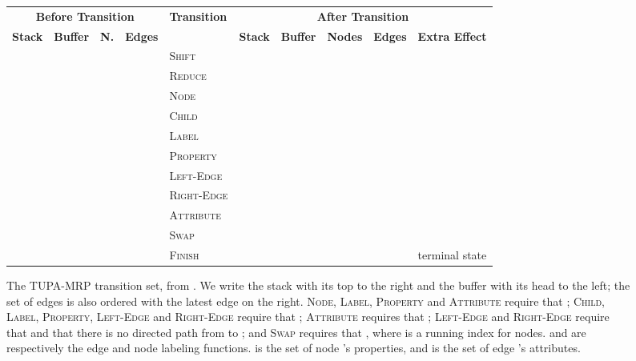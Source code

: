 \documentclass[11pt,a4paper]{article}
\begin{document}
\begin{figure*}[ht]
	\begin{adjustbox}{width=.99\textwidth,margin=1pt,frame}
	\begin{tabular}{llll|l|lllll}
		\multicolumn{4}{c|}{\textbf{\small Before Transition}} &
		\multirow{2}{*}{\textbf{\small Transition}} & 
		\multicolumn{5}{c}{\textbf{\small After Transition}} \\
		\textbf{\footnotesize Stack} & \textbf{\footnotesize Buffer} & 
		\textbf{\footnotesize N.} & \textbf{\footnotesize Edges} & & 
		\textbf{\footnotesize Stack} & \textbf{\footnotesize Buffer} & 
		\textbf{\footnotesize Nodes} & \textbf{\footnotesize Edges} & 
		\textbf{\footnotesize Extra Effect} \\ \hline
		 &  &  &  & \textsc{Shift} &  &  &  &  & \\
		 &  &  &  & \textsc{Reduce} &  &  &  &  & \\
		 &  &  &  & \textsc{Node} &  &  &  &  &  \\
		 &  &  &  & \textsc{Child} &  &  &  &  &  \\
		 &  &  &  & \textsc{Label} &  &  &  &  &  \\
		 &  &  &  & \textsc{Property} &  &  &  &  &  \\
		 &  &  &  & \textsc{Left-Edge} &  &  &  &  &  \\
		 &  &  &  & \textsc{Right-Edge} &  &  &  &  &  \\
		 &  &  &  & \textsc{Attribute} &  &  &  &  &  \\
		 &  &  &  & \textsc{Swap} &  &  &  &  & \\
		 &  &  &  & \textsc{Finish} &  &  &  &  & terminal state \\
	\end{tabular}
	\end{adjustbox}
	\caption{\label{fig:transitions}
	  The TUPA-MRP transition set, from .
	  We write the stack with its top to the right and the buffer with its head to the left;
	  the set of edges is also ordered with the latest edge on the right.
	  \textsc{Node}, \textsc{Label}, \textsc{Property} and \textsc{Attribute}
	  require that ;
	  \textsc{Child}, \textsc{Label}, \textsc{Property},
	  \textsc{Left-Edge} and \textsc{Right-Edge}
	  require that ;
	  \textsc{Attribute} requires that ;
	  \textsc{Left-Edge} and \textsc{Right-Edge}
	  require that  and
	  that there is no directed path from  to ;
	  and \textsc{Swap} requires that , where
	   is a running index for nodes.
	   and  are respectively the edge and node labeling functions.  is the set of node 's properties, and  is the set of edge 's attributes.
	}
\end{figure*}
\end{document}
